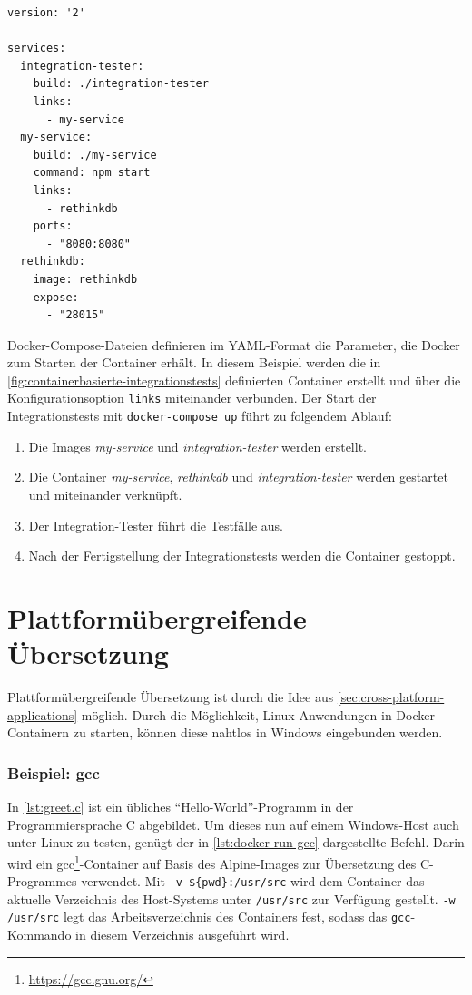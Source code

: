 \begin{lstlisting}[caption=Servicedefinition zum Integrationstesten (docker-compose.yml), label=lst:docker-compose-integrationstests]
version: '2'

services:
  integration-tester:
    build: ./integration-tester
    links:
      - my-service
  my-service:
    build: ./my-service
    command: npm start
    links:
      - rethinkdb
    ports:
      - "8080:8080"
  rethinkdb:
    image: rethinkdb
    expose:
      - "28015"
\end{lstlisting}
Docker-Compose-Dateien definieren im YAML-Format die Parameter, die Docker zum Starten der Container erhält.
In diesem Beispiel werden die in \cref{fig:containerbasierte-integrationstests} definierten Container erstellt und über die Konfigurationsoption \texttt{links} miteinander verbunden.
Der Start der Integrationstests mit \texttt{docker-compose up} führt zu folgendem Ablauf:
\begin{enumerate}
    \item Die Images \emph{my-service} und \emph{integration-tester} werden erstellt.
    \item Die Container \emph{my-service}, \emph{rethinkdb} und \emph{integration-tester} werden gestartet und miteinander verknüpft.
    \item Der Integration-Tester führt die Testfälle aus.
    \item Nach der Fertigstellung der Integrationstests werden die Container gestoppt.
\end{enumerate}

\section{Plattformübergreifende Übersetzung}
\label{sec:plattformuebergreifende-uebersetzung}
Plattformübergreifende Übersetzung ist durch die Idee aus \cref{sec:cross-platform-applications} möglich.
Durch die Möglichkeit, Linux-Anwendungen in Docker-Containern zu starten, können diese nahtlos in Windows eingebunden werden.

\subsubsection{Beispiel: gcc}
In \cref{lst:greet.c} ist ein übliches "`Hello-World"'-Programm in der Programmiersprache C abgebildet.
Um dieses nun auf einem Windows-Host auch unter Linux zu testen, genügt der in \cref{lst:docker-run-gcc} dargestellte Befehl.
Darin wird ein gcc\footnote{\url{https://gcc.gnu.org/}}-Container auf Basis des Alpine-Images zur Übersetzung des C-Programmes verwendet.
Mit \texttt{-v \$\{pwd\}:/usr/src} wird dem Container das aktuelle Verzeichnis des Host-Systems unter \texttt{/usr/src} zur Verfügung gestellt.
\texttt{-w /usr/src} legt das Arbeitsverzeichnis des Containers fest, sodass das \texttt{gcc}-Kommando in diesem Verzeichnis ausgeführt wird.

